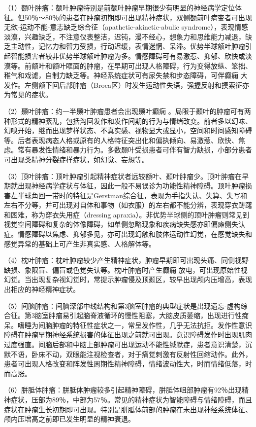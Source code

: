 （1）额叶肿瘤：额叶肿瘤特别是前额叶肿瘤早期很少有明显的神经病学定位体征。但50％～80％的患者在肿瘤初期即可出现精神症状，双侧额前叶病变者可出现无欲-运动不能-意志缺乏综合征（apathetic-akinetic-abulic
syndrome），表现情感淡漠，兴趣缺乏，不注意仪表整洁，迟钝，漫不经心，想象力和思维能力减退，缺乏主动性，记忆力和智力受损，行动迟缓，表情迷惘、呆滞。优势半球额叶肿瘤引起智能损害者较非优势半球额叶肿瘤为多。情感障碍可有易激惹、抑郁、欣快或淡漠等。前额叶和额叶眶面的肿瘤，在早期可出现人格障碍，行为变得放纵、笨拙、稚气和戏谑，自制力缺乏等。神经系统症状可有尿失禁和步态障碍，可伴癫痫
大发作。左侧额下回后部肿瘤（Broca区）时发生运动性失语，强握反射和摸索征亦为常见的症状。

（2）颞叶肿瘤：约一半颞叶肿瘤患者会出现颞叶癫痫
。局限于颞叶的肿瘤可有两种形式的精神紊乱，包括沟回发作和发作间期的行为与情绪改变。前者多以幻味、幻嗅开始，继而出现梦样状态、不真实感、视物显大或显小，空间和时间感知障碍等。后者表现病态人格或原有的人格特征突出化和偏执倾向、易激惹、欣快、焦虑。常有暴发性情绪和暴力行为。多数颞叶受损患者可伴有智力缺损，小部分患者可出现类精神分裂症样症状，如幻觉、妄想等。

（3）顶叶肿瘤：顶叶肿瘤引起精神症状者远较额叶、颞叶肿瘤少。顶叶肿瘤在早期就出现神经病学症状与体征，因此一般不易误诊为功能性精神障碍。顶叶肿瘤损害左半球角回一带时的特征是Gerstman综合征，表现为手指失认、失算、失写和左右不分等，并可出现对自体和事物（如衣服）的左右都不能分辨，表现穿衣踌躇和困难，称为穿衣失用症（dressing
apraxia）。非优势半球侧的顶叶肿瘤则常见到视觉空间障碍和复杂的体像障碍，如单侧忽略现象和疾病缺失感亦即偏瘫侧失认症。情感障碍以焦虑、抑郁多见，亦可出现幻触和肢体运动性幻觉，在感觉缺失和感觉异常的基础上可产生非真实感、人格解体等。

（4）枕叶肿瘤：枕叶肿瘤较少产生精神症状，肿瘤早期即可出现头痛、同侧视野缺损、象限盲、偏盲或色觉失认等。枕叶肿瘤时产生癫痫
放电，可出现原始性视幻觉。当出现复杂视幻觉时，常提示肿瘤侵及顶颞区，较早出现颅内压增高，表现出相应的神经精神症状。

（5）间脑肿瘤：间脑深部中线结构和第3脑室肿瘤的典型症状是出现遗忘-虚构综合征。第3脑室肿瘤易引起脑脊液循环的慢性阻塞，大脑皮质萎缩，出现进行性痴呆。嗜睡为间脑肿瘤的特征性症状之一，常呈发作性，几乎无法抗拒。发作性意识障碍在肿瘤早期神经系统损害的体征出现之前就可出现。意识障碍发作时出现肌肉过度强直。间脑后部和中脑上部肿瘤可出现运动不能性缄默症，患者意识清楚，沉默不语，卧床不动，双眼能注视检查者，对于痛觉刺激有反射性回缩动作。此外，患者可出现人格改变和阵发性周期性精神障碍，情绪波动性大，时而情绪低落，时而高涨。

（6）胼胝体肿瘤：胼胝体肿瘤较多引起精神障碍，胼胝体咀部肿瘤有92％出现精神症状，压部为89％，中部为57％。常见的精神症状为智能障碍与情绪障碍，而且症状在肿瘤生长初期即可出现。特别是胼胝体前部的肿瘤在未出现神经系统体征、颅内压增高之前即已发生明显的精神衰退。

